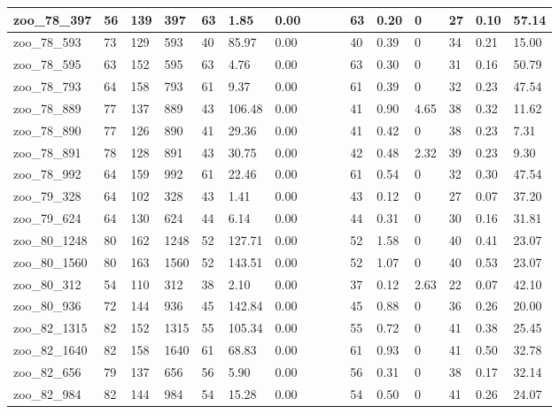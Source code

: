 \begin{landscape}
\begin{longtable}{llllllllllllllll}
zoo\_78\_397 & 56 & 139 & 397 & 63 & 1.85 & 0.00 &  &  &  & 63 & 0.20 & 0 & 27 & 0.10 & 57.14 \\ \hline 
zoo\_78\_593 & 73 & 129 & 593 & 40 & 85.97 & 0.00 &  &  &  & 40 & 0.39 & 0 & 34 & 0.21 & 15.00 \\ \hline 
zoo\_78\_595 & 63 & 152 & 595 & 63 & 4.76 & 0.00 &  &  &  & 63 & 0.30 & 0 & 31 & 0.16 & 50.79 \\ \hline 
zoo\_78\_793 & 64 & 158 & 793 & 61 & 9.37 & 0.00 &  &  &  & 61 & 0.39 & 0 & 32 & 0.23 & 47.54 \\ \hline 
zoo\_78\_889 & 77 & 137 & 889 & 43 & 106.48 & 0.00 &  &  &  & 41 & 0.90 & 4.65 & 38 & 0.32 & 11.62 \\ \hline 
zoo\_78\_890 & 77 & 126 & 890 & 41 & 29.36 & 0.00 &  &  &  & 41 & 0.42 & 0 & 38 & 0.23 & 7.31 \\ \hline 
zoo\_78\_891 & 78 & 128 & 891 & 43 & 30.75 & 0.00 &  &  &  & 42 & 0.48 & 2.32 & 39 & 0.23 & 9.30 \\ \hline 
zoo\_78\_992 & 64 & 159 & 992 & 61 & 22.46 & 0.00 &  &  &  & 61 & 0.54 & 0 & 32 & 0.30 & 47.54 \\ \hline 
zoo\_79\_328 & 64 & 102 & 328 & 43 & 1.41 & 0.00 &  &  &  & 43 & 0.12 & 0 & 27 & 0.07 & 37.20 \\ \hline 
zoo\_79\_624 & 64 & 130 & 624 & 44 & 6.14 & 0.00 &  &  &  & 44 & 0.31 & 0 & 30 & 0.16 & 31.81 \\ \hline 
zoo\_80\_1248 & 80 & 162 & 1248 & 52 & 127.71 & 0.00 &  &  &  & 52 & 1.58 & 0 & 40 & 0.41 & 23.07 \\ \hline 
zoo\_80\_1560 & 80 & 163 & 1560 & 52 & 143.51 & 0.00 &  &  &  & 52 & 1.07 & 0 & 40 & 0.53 & 23.07 \\ \hline 
zoo\_80\_312 & 54 & 110 & 312 & 38 & 2.10 & 0.00 &  &  &  & 37 & 0.12 & 2.63 & 22 & 0.07 & 42.10 \\ \hline 
zoo\_80\_936 & 72 & 144 & 936 & 45 & 142.84 & 0.00 &  &  &  & 45 & 0.88 & 0 & 36 & 0.26 & 20.00 \\ \hline 
zoo\_82\_1315 & 82 & 152 & 1315 & 55 & 105.34 & 0.00 &  &  &  & 55 & 0.72 & 0 & 41 & 0.38 & 25.45 \\ \hline 
zoo\_82\_1640 & 82 & 158 & 1640 & 61 & 68.83 & 0.00 &  &  &  & 61 & 0.93 & 0 & 41 & 0.50 & 32.78 \\ \hline 
zoo\_82\_656 & 79 & 137 & 656 & 56 & 5.90 & 0.00 &  &  &  & 56 & 0.31 & 0 & 38 & 0.17 & 32.14 \\ \hline 
zoo\_82\_984 & 82 & 144 & 984 & 54 & 15.28 & 0.00 &  &  &  & 54 & 0.50 & 0 & 41 & 0.26 & 24.07 \\ \hline 

\end{longtable}
\end{landscape}
